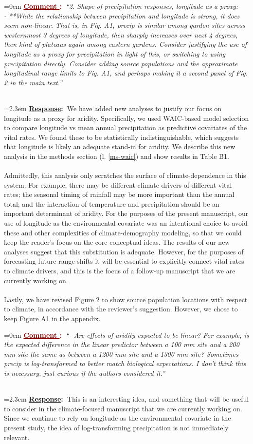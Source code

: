 \documentclass[12pt]{article}
\newcounter{cN}
\newcommand{\comment}[1]{
	\vspace{2em}
	\refstepcounter{cN} %
	\noindent \hangindent=0em \textbf{\textcolor{Maroon}{\uline{Comment \thecN}:~}}\emph{``#1''}
	}
\newcommand{\response}[1]{
	\\[0.25em]
	\hangindent=2.3em \textbf{\textcolor{NavyBlue}{\uline{Response}:~}}#1
	}
\begin{document}
\comment{2. Shape of precipitation responses, longitude as a proxy:
	\\
	- **While the relationship between precipitation and longitude is strong, it does seem non-linear. That is, in Fig. A1, precip is similar among garden sites across westernmost 3 degrees of longitude, then sharply increases over next 4 degrees, then kind of plateaus again among eastern gardens. Consider justifying the use of longitude as a proxy for precipitation in light of this, or switching to using precipitation directly. Consider adding source populations and the approximate longitudinal range limits to Fig. A1, and perhaps making it a second panel of Fig. 2 in the main text.}
\response{We have added new analyses to justify our focus on longitude as a proxy for aridity. Specifically, we used WAIC-based model selection to compare longitude vs mean annual precipitation as predictive covariates of the vital rates. We found these to be statistically indistinguishable, which suggests that longitude is likely an adequate stand-in for aridity. We describe this new analysis in the methods section (l. \ref{ms-waic}) and show results in Table B1.
\\
\\
Admittedly, this analysis only scratches the surface of climate-dependence in this system. For example, there may be different climate drivers of different vital rates; the seasonal timing of rainfall may be more important than the annual total; and the interaction of temperature and precipitation should be an important determinant of aridity. For the purposes of the present manuscript, our use of longitude as the environmental covariate was an intentional choice to avoid these and other complexities of climate-demography modeling, so that we could keep the reader's focus on the core conceptual ideas. The results of our new analyses suggest that this substitution is adequate. However, for the purposes of forecasting future range shifts it will be essential to explicitly connect vital rates to climate drivers, and this is the focus of a follow-up manuscript that we are currently working on.
\\
\\
Lastly, we have revised Figure 2 to show source population locations with respect to climate, in accordance with the reviewer's suggestion. However, we chose to keep Figure A1 in the appendix.}

\comment{- Are effects of aridity expected to be linear? For example, is the expected difference in the linear predictor between a 100 mm site and a 200 mm site the same as between a 1200 mm site and a 1300 mm site? Sometimes precip is log-transformed to better match biological expectations. I don't think this is necessary, just curious if the authors considered it.}
\response{This is an interesting idea, and something that will be useful to consider in the climate-focused manuscript that we are currently working on. Since we continue to rely on longitude as the environmental covariate in the present study, the idea of log-transforming precipitation is not immediately relevant.}
\end{document}
